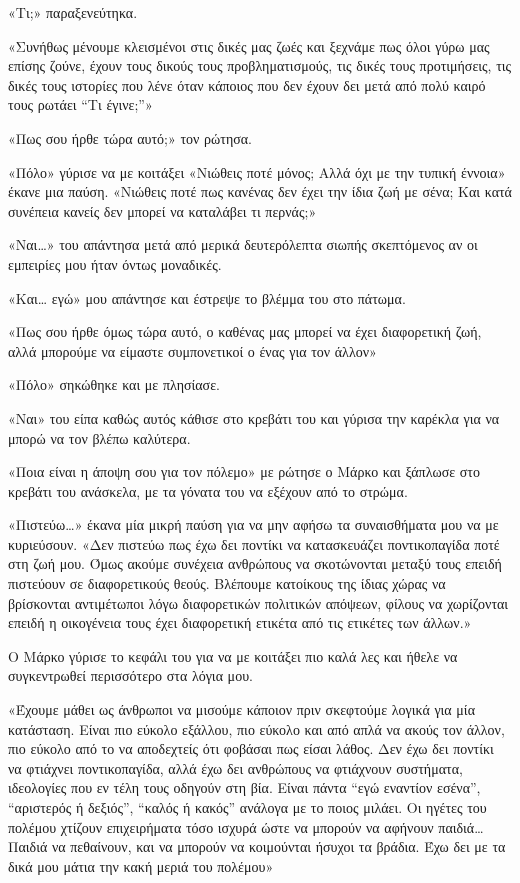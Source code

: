 \documentclass[12pt,twoside, openany]{book}
\begin{document}
«Τι;» παραξενεύτηκα.

«Συνήθως μένουμε κλεισμένοι στις δικές μας ζωές και ξεχνάμε πως όλοι γύρω μας επίσης ζούνε, έχουν τους δικούς τους προβληματισμούς, τις δικές τους προτιμήσεις, τις δικές τους ιστορίες που λένε όταν κάποιος που δεν έχουν δει μετά από πολύ καιρό τους ρωτάει “Τι έγινε;”»

«Πως σου ήρθε τώρα αυτό;» τον ρώτησα.

«Πόλο» γύρισε να με κοιτάξει «Νιώθεις ποτέ μόνος; Αλλά όχι με την τυπική έννοια» έκανε μια παύση. «Νιώθεις ποτέ πως κανένας δεν έχει την ίδια ζωή με σένα; Και κατά συνέπεια κανείς δεν μπορεί να καταλάβει τι περνάς;»

«Ναι…» του απάντησα μετά από μερικά δευτερόλεπτα σιωπής σκεπτόμενος αν οι εμπειρίες μου ήταν όντως μοναδικές.

«Και… εγώ» μου απάντησε και έστρεψε το βλέμμα του στο πάτωμα. 

«Πως σου ήρθε όμως τώρα αυτό, ο καθένας μας μπορεί να έχει διαφορετική ζωή, αλλά μπορούμε να είμαστε συμπονετικοί ο ένας για τον άλλον»

«Πόλο» σηκώθηκε και με πλησίασε.

«Ναι» του είπα καθώς αυτός κάθισε στο κρεβάτι του και γύρισα την καρέκλα για να μπορώ να τον βλέπω καλύτερα.

«Ποια είναι η άποψη σου για τον πόλεμο» με ρώτησε ο Μάρκο και ξάπλωσε στο κρεβάτι του ανάσκελα, με τα γόνατα του να εξέχουν από το στρώμα.

«Πιστεύω…» έκανα μία μικρή παύση για να μην αφήσω τα συναισθήματα μου να με κυριεύσουν. «Δεν πιστεύω πως έχω δει ποντίκι να κατασκευάζει ποντικοπαγίδα ποτέ στη ζωή μου. Όμως ακούμε συνέχεια ανθρώπους να σκοτώνονται μεταξύ τους επειδή πιστεύουν σε διαφορετικούς θεούς. Βλέπουμε κατοίκους της ίδιας χώρας να βρίσκονται αντιμέτωποι λόγω διαφορετικών πολιτικών απόψεων, φίλους να χωρίζονται επειδή η οικογένεια τους έχει διαφορετική ετικέτα από τις ετικέτες των άλλων.»

Ο Μάρκο γύρισε το κεφάλι του για να με κοιτάξει πιο καλά λες και ήθελε να συγκεντρωθεί περισσότερο στα λόγια μου.

«Έχουμε μάθει ως άνθρωποι να μισούμε κάποιον πριν σκεφτούμε λογικά για μία κατάσταση. Είναι πιο εύκολο εξάλλου, πιο εύκολο και από απλά να ακούς τον άλλον, πιο εύκολο από το να αποδεχτείς ότι φοβάσαι πως είσαι λάθος. Δεν έχω δει ποντίκι να φτιάχνει ποντικοπαγίδα, αλλά έχω δει ανθρώπους να φτιάχνουν συστήματα, ιδεολογίες που εν τέλη τους οδηγούν στη βία. Είναι πάντα “εγώ εναντίον εσένα”, “αριστερός ή δεξιός”, “καλός ή κακός” ανάλογα με το ποιος μιλάει. Οι ηγέτες του πολέμου χτίζουν επιχειρήματα τόσο ισχυρά ώστε να μπορούν να αφήνουν παιδιά… Παιδιά να πεθαίνουν, και να μπορούν να κοιμούνται ήσυχοι τα βράδια. Έχω δει με τα δικά μου μάτια την κακή μεριά του πολέμου»
\end{document}
